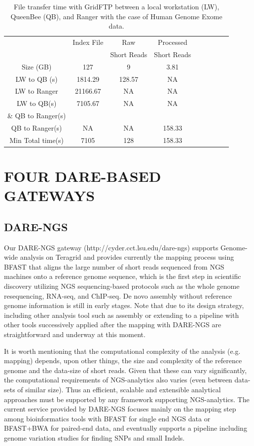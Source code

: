 \documentclass{sig-alternate}
\begin{document}
 \begin{table}
 \small
 \begin{tabular}{|c|c|c|c|c|c|c|c|c|} 
 \hline 
	                      &  Index File	&Raw &	Processed\\
	                      &&Short Reads& Short Reads\\
\hline 
Size  (GB)    	             &127&	9	&3.81\\
 \hline                       
LW to QB (s)   & 1814.29&	128.57&  NA\\
  \hline
LW to Ranger & 21166.67 & NA & NA\\
   \hline
LW to QB(s)    & 7105.67& NA &NA\\
 \& QB to Ranger(s)     &&&\\
 \hline
QB to Ranger(s)   	&NA&NA& 158.33\\
\hline
Min Total time(s)    &	7105 &	128&	158.33\\
 \hline
\end{tabular}
\caption{File transfer time with GridFTP between a local workstation (LW), QueenBee (QB), and Ranger with the case of Human Genome Exome data.  }

 \label{table:NGS-Distributed-file} 
\end{table}


\section{FOUR DARE-BASED GATEWAYS}
\subsection{DARE-NGS}
Our DARE-NGS gateway (http://cyder.cct.lsu.edu/dare-ngs) supports Genome-wide analysis on Teragrid and provides currently the mapping process using BFAST that aligns the large number of short reads sequenced from NGS machines onto a reference genome sequence, which is the first step in scientific discovery utilizing NGS sequencing-based protocols such as the whole genome resequencing, RNA-seq, and ChIP-seq.  De novo assembly without reference genome information is still in early stages.  Note that due to its design strategy, including other analysis tool such as assembly or extending to a pipeline with other tools successively applied after the mapping with DARE-NGS are straightforward and underway at this moment.

It is worth mentioning that the computational complexity
of the analysis (e.g. mapping) depends, upon other things, the size
and complexity of the reference genome and the data-size of short reads.
Given that these can vary significantly, the computational
requirements of NGS-analytics also varies (even between data-sets of
similar size).  Thus an efficient, scalable and extensible analytical
approaches must be supported by any framework supporting
NGS-analytics.  The current service provided by DARE-NGS focuses mainly on the mapping step among bioinformatics tools with BFAST for single end NGS data or BFAST+BWA for paired-end data, and eventually supports a pipeline including genome variation studies for finding SNPs and small Indels.
\end{document}
